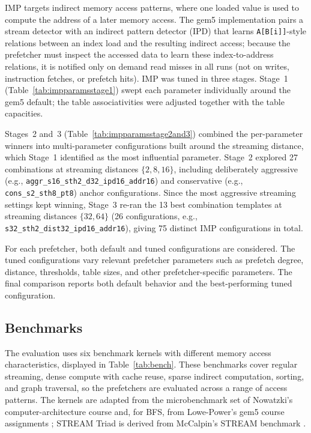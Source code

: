 \documentclass[12pt, letterpaper]{article}
\begin{document}
\noindent IMP targets indirect memory access patterns, where one loaded value is used to compute the address of a later memory access. The gem5 implementation pairs a stream detector with an indirect pattern detector (IPD) that learns \texttt{A[B[i]]}-style relations between an index load and the resulting indirect access; because the prefetcher must inspect the accessed data to learn these index-to-address relations, it is notified only on demand read misses in all runs (not on writes, instruction fetches, or prefetch hits). IMP was tuned in three stages. Stage~1 (Table~\ref{tab:impparamsstage1}) swept each parameter individually around the gem5 default; the table associativities were adjusted together with the table capacities.

\noindent Stages~2 and~3 (Table~\ref{tab:impparamsstage2and3}) combined the per-parameter winners into multi-parameter configurations built around the streaming distance, which Stage~1 identified as the most influential parameter. Stage~2 explored 27 combinations at streaming distances $\{2, 8, 16\}$, including deliberately aggressive (e.g., \texttt{aggr\_s16\_sth2\_d32\_ipd16\_addr16}) and conservative (e.g., \texttt{cons\_s2\_sth8\_pt8}) anchor configurations. Since the most aggressive streaming settings kept winning, Stage~3 re-ran the 13 best combination templates at streaming distances $\{32, 64\}$ (26 configurations, e.g., \texttt{s32\_sth2\_dist32\_ipd16\_addr16}), giving 75 distinct IMP configurations in total.

\noindent For each prefetcher, both default and tuned configurations are considered. The tuned configurations vary relevant prefetcher parameters such as prefetch degree, distance, thresholds, table sizes, and other prefetcher-specific parameters. The final comparison reports both default behavior and the best-performing tuned configuration.

\subsection{Benchmarks}
\label{sec:eval:benchmarks}

The evaluation uses six benchmark kernels with different memory access characteristics, displayed in Table~\ref{tab:bench}. These benchmarks cover regular streaming, dense compute with cache reuse, sparse indirect computation, sorting, and graph traversal, so the prefetchers are evaluated across a range of access patterns. The kernels are adapted from the microbenchmark set of Nowatzki's computer-architecture course \cite{nowatzki-microbench} and, for BFS, from Lowe-Power's gem5 course assignments \cite{jlp-gem5-assignment}; STREAM Triad is derived from McCalpin's STREAM benchmark \cite{McCalpin2007}.
\end{document}
